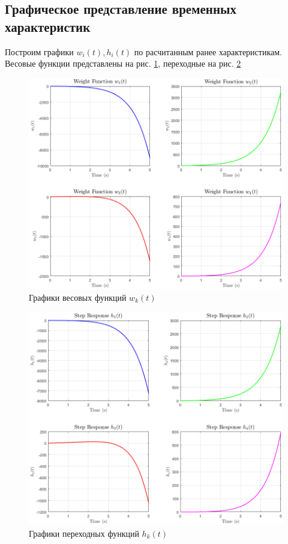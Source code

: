 \documentclass[a4paper, 12pt]{article}
\begin{document}
    \subsection{Графическое представление временных характеристик}
    Построим графики $w_i(t),h_i(t)$ по расчитанным ранее характеристикам.
    Весовые функции представлены на рис. \ref{fig:1task_wi}, переходные на рис. \ref{fig:1task_hi}
    \begin{figure}[H]
        \centering
        \includegraphics[scale=0.585]{1task_wi.png}
        \captionsetup{skip=0pt}
        \caption{Графики весовых функций $w_k(t)$}
        \label{fig:1task_wi}
    \end{figure}
    \begin{figure}[H]
        \centering
        \includegraphics[scale=0.585]{1task_hi.png}
        \captionsetup{skip=0pt}
        \caption{Графики переходных функций $h_k(t)$}
        \label{fig:1task_hi}
    \end{figure}
\end{document}
